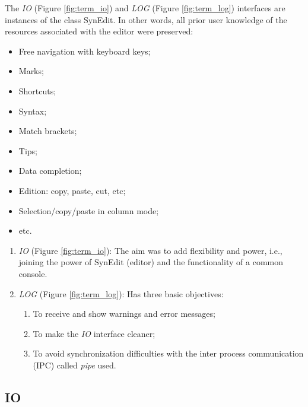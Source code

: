 The \textit{IO}
(Figure \ref{fig:term_io})
and \textit{LOG}
(Figure \ref{fig:term_log})
interfaces are instances of the class
SynEdit. In other words, all prior user knowledge of the resources associated with the editor were preserved:

\begin{itemize}
  \item Free navigation with keyboard keys;
  \item Marks;
  \item Shortcuts;
  \item Syntax;
  \item Match brackets;
  \item Tips;
  \item Data completion;
  \item Edition: copy, paste, cut, etc;
  \item Selection/copy/paste in column mode;
  \item etc.
\end{itemize}

\begin{enumerate}
  \item \textit{IO} (Figure \ref{fig:term_io}): The aim was to add flexibility and power, i.e.,
    joining the power of SynEdit (editor) and the functionality of
    a common console.
  \item \textit{LOG} (Figure \ref{fig:term_log}): Has three basic objectives:
    \begin{enumerate}
      \item To receive and show warnings and error messages;
      \item To make the \textit{IO} interface cleaner;
      \item To avoid synchronization difficulties with the inter
        process communication (IPC) called \textit{pipe} used.
    \end{enumerate}
\end{enumerate}

\hypertarget{working_term_io}{}
\subsection{IO}

